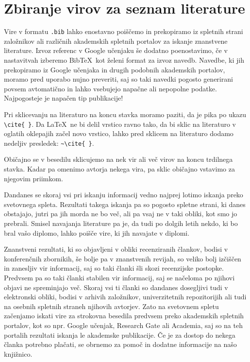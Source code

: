 \documentclass[a4paper,12pt,openright]{book}
\newcommand{\BibTeX}{{\sc Bib}\TeX}
\begin{document}
\section{Zbiranje virov za seznam literature}

Vire v formatu \texttt{.bib}  lahko enostavno poiščemo in prekopiramo iz spletnih strani založnikov ali različnih akademskih spletnih portalov za iskanje znanstvene literature.
Izvoz  referenc v Google učenjaku še dodatno poenostavimo, če v nastavitvah izberemo \BibTeX\ kot želeni format za izvoz navedb.
Navedbe, ki jih  prekopiramo iz Google učenjaka in drugih podobnih akademskih portalov, moramo pred uporabo nujno preveriti, saj so taki navedki pogosto generirani povsem avtomatično in lahko vsebujejo napačne ali nepopolne podatke.
Najpogosteje je napačen tip publikacije!

Pri sklicevanju na literaturo na koncu stavka moramo paziti, da je pika po ukazu \verb=\cite{ }=.
Da \LaTeX\ ne bi delil vrstico ravno tako, da bi sklic na literaturo v oglatih oklepajih začel novo vrstico, lahko pred sklicem na literaturo dodamo nedeljiv presledek: \verb=~\cite{ }=.

Običajno se v besedilu sklicujemo  na nek vir ali več virov na koncu trdilnega stavka. 
Kadar pa omenimo avtorja nekega vira, pa sklic običajno vstavimo za njegovim priimkom.


Dandanes  se skoraj  vsi pri iskanju informacij vedno najprej lotimo iskanja preko svetovnega spleta.
Rezultati takega iskanja pa so pogosto spletne strani, ki danes obstajajo, jutri pa jih morda ne bo več, ali pa vsaj ne v taki obliki, kot smo jo prebrali.
Smisel navajanja literature pa je, da tudi po dolgih letih nekdo, ki bo bral vašo diplomo, lahko poišče vire, ki jih navajate v diplomi.

Znanstveni rezultati, ki so objavljeni v obliki recenziranih člankov, bodisi v konferenčnih zbornikih, še bolje pa v znanstvenih revijah, so veliko bolj izčiščen in zanesljiv vir informacij, saj
so taki članki šli skozi recenzijske postopke. Predvsem pa so taki članki stabilen vir informacij, saj se načeloma po njihovi objavi ne spreminjajo več.
Skoraj vsi ti članki so dandanes dosegljivi tudi v elektronski obliki, bodisi v arhivih založnikov, univerzitetnih repozitorijih ali tudi na osebnih spletnih straneh njihovih avtorjev.
Zato na svetovnem spletu začenjamo iskati vire za strokovna besedila predvsem preko akademskih spletnih portalov, kot so npr. Google učenjak, Research Gate ali Academia, saj so na teh portalih rezultati iskanja le akademske publikacije.
Če je za dostop do nekega članka potrebno plačati, se obrnemo za pomoč in dodatne informacije na  našo knjižnico.
\end{document}
